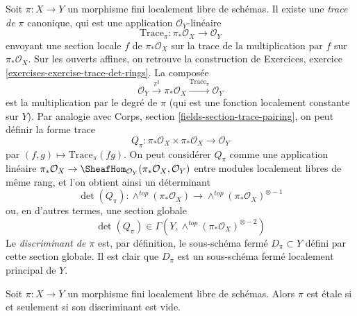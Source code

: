 \medskip\noindent
Soit $\pi : X \to Y$ un morphisme fini localement
libre de schémas. Il existe une {\it trace de $\pi$} canonique,
qui est une application $\mathcal{O}_Y$-linéaire
$$
\text{Trace}_\pi : \pi_*\mathcal{O}_X \longrightarrow \mathcal{O}_Y
$$
envoyant une section locale $f$ de $\pi_*\mathcal{O}_X$ sur la
trace de la multiplication par $f$ sur $\pi_*\mathcal{O}_X$. Sur les
ouverts affines, on retrouve la construction de
Exercices, exercice \ref{exercises-exercise-trace-det-rings}.
La composée
$$
\mathcal{O}_Y \xrightarrow{\pi^\sharp} \pi_*\mathcal{O}_X
\xrightarrow{\text{Trace}_\pi} \mathcal{O}_Y
$$
est la multiplication par le degré de $\pi$ (qui est une fonction localement constante
sur $Y$). Par analogie avec
Corps, section \ref{fields-section-trace-pairing},
on peut définir la forme trace
$$
Q_\pi :
\pi_*\mathcal{O}_X \times \pi_*\mathcal{O}_X
\longrightarrow
\mathcal{O}_Y
$$
par $(f, g) \mapsto \text{Trace}_\pi(fg)$. On peut considérer
$Q_\pi$ comme une application linéaire
$\pi_*\mathcal{O}_X \to
\SheafHom_{\mathcal{O}_Y}(\pi_*\mathcal{O}_X, \mathcal{O}_Y)$
entre modules localement libres de même rang, et l'on obtient ainsi
un déterminant
$$
\det(Q_\pi) :
\wedge^{top}(\pi_*\mathcal{O}_X)
\longrightarrow
\wedge^{top}(\pi_*\mathcal{O}_X)^{\otimes -1}
$$
ou, en d'autres termes, une section globale
$$
\det(Q_\pi) \in \Gamma(Y, \wedge^{top}(\pi_*\mathcal{O}_X)^{\otimes -2})
$$
Le {\it discriminant de $\pi$} est, par définition, le sous-schéma
fermé $D_\pi \subset Y$ défini par cette section globale.
Il est clair que $D_\pi$ est un sous-schéma fermé localement principal de $Y$.

\begin{lemma}
\label{lemma-discriminant}
Soit $\pi : X \to Y$ un morphisme fini localement
libre de schémas. Alors $\pi$ est étale si et seulement si son discriminant est vide.
\end{lemma}


